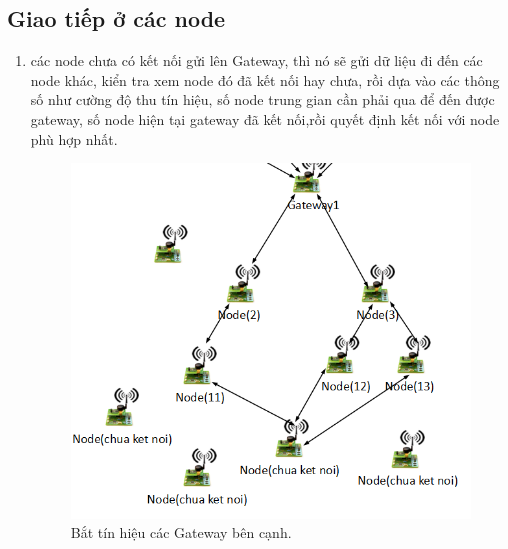 \subsection{Giao tiếp ở các node}
\begin{enumerate}
    \item các node chưa có kết nối gửi lên Gateway, thì nó sẽ gửi dữ liệu đi đến các node khác, kiển tra xem node đó đã kết nối hay chưa, rồi dựa vào các thông số như cường độ thu tín hiệu, số node trung gian cần phải qua để đến được gateway, số node hiện tại gateway đã kết nối,rồi quyết định kết nối với node phù hợp nhất.

\begin{center}
    \begin{figure}[htp]
    \begin{center}
     \includegraphics[scale=0.45]{image2/chuaketnoi.png}
    \end{center}
    \caption{Bắt tín hiệu các Gateway bên cạnh.}
    \label{refhinh1}
    \end{figure}
\end{center}


\end{enumerate}
